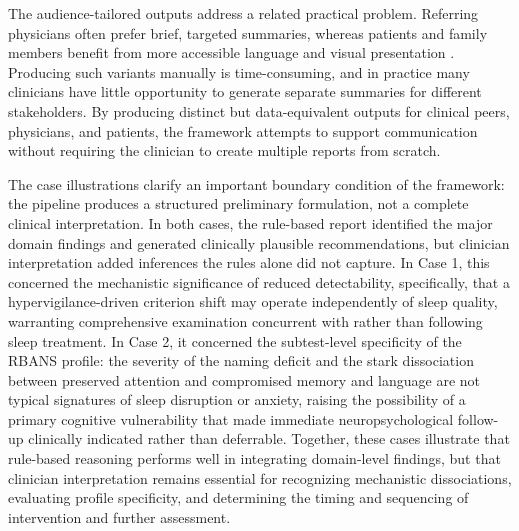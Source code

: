 \documentclass[11pt,a4paper]{article}
\begin{document}
The audience-tailored outputs address a related practical problem. Referring physicians often prefer brief, targeted summaries, whereas patients and family members benefit from more accessible language and visual presentation \citep{Postal2018ReportWriting, Postal2024, Gruters2022}. Producing such variants manually is time-consuming, and in practice many clinicians have little opportunity to generate separate summaries for different stakeholders. By producing distinct but data-equivalent outputs for clinical peers, physicians, and patients, the framework attempts to support communication without requiring the clinician to create multiple reports from scratch.


The case illustrations clarify an important boundary condition of the framework: 
the pipeline produces a structured preliminary formulation, not a complete clinical interpretation. 
In both cases, the rule-based report identified the major domain findings and generated clinically plausible recommendations, but clinician interpretation added inferences the rules alone did not capture. 
In Case 1, this concerned the mechanistic significance of reduced detectability, specifically, that a hypervigilance-driven criterion shift may operate independently of sleep quality, warranting comprehensive examination concurrent with rather than following sleep treatment. 
In Case 2, it concerned the subtest-level specificity of the RBANS profile: the severity of the naming deficit and the stark dissociation between preserved attention and compromised memory and language are not typical signatures of sleep disruption or anxiety, raising the possibility of a primary cognitive vulnerability that made immediate neuropsychological follow-up clinically indicated rather than deferrable. 
Together, these cases illustrate that rule-based reasoning performs well in integrating domain-level findings, but that clinician interpretation remains essential for recognizing mechanistic dissociations, evaluating profile specificity, and determining the timing and sequencing of intervention and further assessment.
\end{document}
